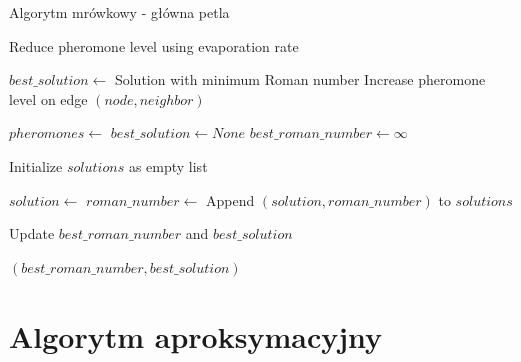 \begin{algorithm}
    \caption*{Algorytm mrówkowy - główna petla}
    \begin{algorithmic}[1]
    
                \State Reduce pheromone level using evaporation rate
            \EndFor
    
            \State $best\_solution \gets$ Solution with minimum Roman number
                    \State Increase pheromone level on edge $(node, neighbor)$
                \EndFor
            \EndFor
        \EndFunction
    
            \State $pheromones \gets$ 
            \State $best\_solution \gets None$
            \State $best\_roman\_number \gets \infty$
    
                \State Initialize $solutions$ as empty list
    
                    \State $solution \gets$ 
                    \State $roman\_number \gets$ 
                    \State Append $(solution, roman\_number)$ to $solutions$
    
                        \State Update $best\_roman\_number$ and $best\_solution$
                    \EndIf
                \EndFor
    
                \State {}
            \EndFor
    
            \State \Return $(best\_roman\_number, best\_solution)$
        \EndFunction
    
    \end{algorithmic}
\end{algorithm}

\section{Algorytm aproksymacyjny}

